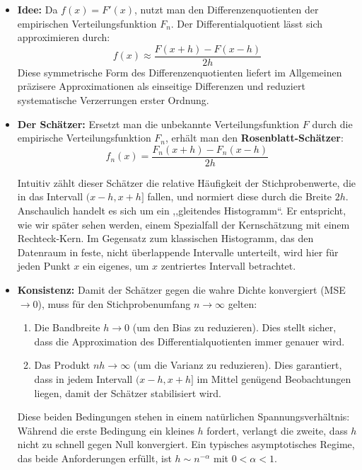 \documentclass[a4paper, 11pt]{scrartcl}
\begin{document}
\begin{itemize}
	\item \textbf{Idee:} Da $f(x) = F'(x)$, nutzt man den Differenzenquotienten der empirischen Verteilungsfunktion $F_n$. Der Differentialquotient lässt sich approximieren durch:
	      \begin{equation}
	      	f(x) \approx \frac{F(x+h) - F(x-h)}{2h}
	      \end{equation}
	      Diese symmetrische Form des Differenzenquotienten liefert im Allgemeinen präzisere Approximationen als einseitige Differenzen und reduziert systematische Verzerrungen erster Ordnung.
	      
	\item \textbf{Der Schätzer:} Ersetzt man die unbekannte Verteilungsfunktion $F$ durch die empirische Verteilungsfunktion $F_n$, erhält man den \textbf{Rosenblatt-Schätzer}:
	      \begin{equation}
	      	f_n(x) = \frac{F_n(x+h) - F_n(x-h)}{2h}
	      \end{equation}
	      
	      Intuitiv zählt dieser Schätzer die relative Häufigkeit der Stichprobenwerte, die in das Intervall $(x-h, x+h]$ fallen, und normiert diese durch die Breite $2h$. Anschaulich handelt es sich um ein ,,gleitendes Histogramm``. Er entspricht, wie wir später sehen werden, einem Spezialfall der Kernschätzung mit einem Rechteck-Kern. Im Gegensatz zum klassischen Histogramm, das den Datenraum in feste, nicht überlappende Intervalle unterteilt, wird hier für jeden Punkt $x$ ein eigenes, um $x$ zentriertes Intervall betrachtet.
	      
	\item \textbf{Konsistenz:} Damit der Schätzer gegen die wahre Dichte konvergiert (MSE $\to 0$), muss für den Stichprobenumfang $n \to \infty$ gelten:
	      \begin{enumerate}
	      	\item Die Bandbreite $h \to 0$ (um den Bias zu reduzieren). Dies stellt sicher, dass die Approximation des Differentialquotienten immer genauer wird.
	      	\item Das Produkt $nh \to \infty$ (um die Varianz zu reduzieren). Dies garantiert, dass in jedem Intervall $(x-h, x+h]$ im Mittel genügend Beobachtungen liegen, damit der Schätzer stabilisiert wird.
	      \end{enumerate}
	      Diese beiden Bedingungen stehen in einem natürlichen Spannungsverhältnis: Während die erste Bedingung ein kleines $h$ fordert, verlangt die zweite, dass $h$ nicht zu schnell gegen Null konvergiert. Ein typisches asymptotisches Regime, das beide Anforderungen erfüllt, ist $h \sim n^{-\alpha}$ mit $0 < \alpha < 1$.
\end{itemize}
\end{document}

